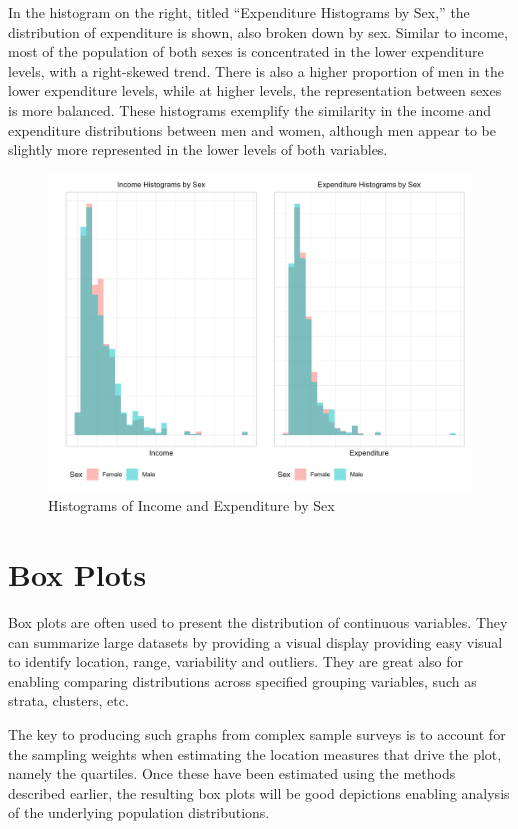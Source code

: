 \documentclass[
  12pt,
]{book}
\begin{document}
In the histogram on the right, titled ``Expenditure Histograms by Sex,'' the distribution of expenditure is shown, also broken down by sex. Similar to income, most of the population of both sexes is concentrated in the lower expenditure levels, with a right-skewed trend. There is also a higher proportion of men in the lower expenditure levels, while at higher levels, the representation between sexes is more balanced. These histograms exemplify the similarity in the income and expenditure distributions between men and women, although men appear to be slightly more represented in the lower levels of both variables.

\begin{figure}
\includegraphics[width=33.33in]{www/05_graficas/02_Hist_sex} \caption{Histograms of Income and Expenditure by Sex}\label{fig:HistIncomeExpenditureSex}
\end{figure}

\hypertarget{box-plots}{%
\section{Box Plots}\label{box-plots}}

Box plots are often used to present the distribution of continuous variables. They can summarize large datasets by providing a visual display providing easy visual to identify location, range, variability and outliers. They are great also for enabling comparing distributions across specified grouping variables, such as strata, clusters, etc.

The key to producing such graphs from complex sample surveys is to account for the sampling weights when estimating the location measures that drive the plot, namely the quartiles. Once these have been estimated using the methods described earlier, the resulting box plots will be good depictions enabling analysis of the underlying population distributions.
\end{document}
